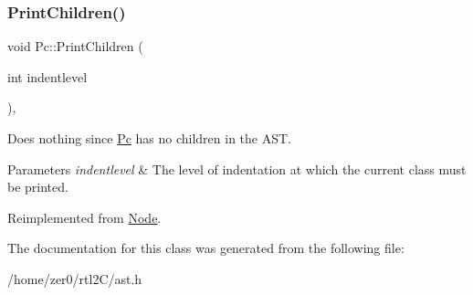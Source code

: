 \mbox{\label{class_pc_ad44ccd9eecca2d6b41205abf80996412}} 
\subsubsection{\texorpdfstring{Print\+Children()}{PrintChildren()}}
{\footnotesize\ttfamily void Pc\+::\+Print\+Children (\begin{DoxyParamCaption}\item[{int}]{indentlevel }\end{DoxyParamCaption})\hspace{0.3cm}{\ttfamily [inline]}, {\ttfamily [virtual]}}

Does nothing since \hyperlink{class_pc}{Pc} has no children in the A\+ST. 
\begin{DoxyParams}{Parameters}
{\em indentlevel} & The level of indentation at which the current class must be printed. \\
\hline
\end{DoxyParams}


Reimplemented from \hyperlink{class_node_a3e67ec8d22182b721717af14fe0c3000}{Node}.



The documentation for this class was generated from the following file\+:\begin{DoxyCompactItemize}
\item 
/home/zer0/rtl2\+C/ast.\+h\end{DoxyCompactItemize}
